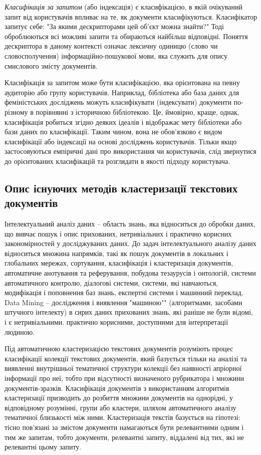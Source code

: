 \textit{Класифікація за запитом} (або індексація) є класифікацією, в якій очікуваний запит від користувачів впливає на те, як документи класифікуються. Класифікатор запитує себе: "За якими дескрипторами цей об'єкт можна знайти?" Тоді оброблюються всі можливі запити та обираються найбільш відповідні. Поняття дескриптора в даному контексті означає лексичну одиницю (слово чи словосполучення) інформаційно-пошукової мови, яка служить для опису смислового змісту документів.

Класифікація за запитом може бути класифікацією, яка орієнтована на певну аудиторію або групу користувачів. Наприклад, бібліотека або база даних для феміністських досліджень можуть класифікувати (індексувати) документи по-різному в порівнянні з історичною бібліотекою. Це, ймовірно, краще, однак, класифікація робиться згідно деяких ідеалів і відображає мету бібліотеки або бази даних по класифікації. Таким чином, вона не обов'язково є видом класифікації або індексації на основі досліджень користувачів. Тільки якщо застосовуються емпіричні дані про використання чи користувачів, слід звернутися до орієнтованих класифікацій та розглядати в якості підходу користувача.

\subsection{Опис існуючих методів кластеризації текстових документів}
Інтелектуальний аналіз даних – область знань, яка відноситься до обробки даних, що вивчає пошук і опис прихованих, нетривіальних і практично корисних закономірностей у досліджуваних даних. До задач інтелектуального аналізу даних відноситься множина напрямків, такі як пошук документів в локальних і глобальних мережах, сортування, класифікація і кластеризація документів, автоматичне анотування та реферування, побудова тезаурусів і онтологій, системи автоматичного контролю, діалогові системи, системи, які навчаються, модифікація і поповнення баз знань, експертні системи і машинний переклад. Data Mining – дослідження і виявлення "машиною"" (алгоритмами, засобами штучного інтелекту) в сирих даних прихованих знань, які раніше не були відомі, і є нетривіальними. практично корисними, доступними для інтерпретації людиною.

Під автоматичною кластеризацією текстових документів розуміють процес класифікації колекції текстових документів, який базується тільки на аналізі та виявленні внутрішньої тематичної структури колекції без наявності апріорної інформації про неї, тобто при відсутності визначеного рубрикатора і множини документів-зразків. Класифікація документів з використанням алгоритмів кластеризації призводить до розбиття множини документів на однорідні, у відповідному розумінні, групи або кластери, шляхом автоматичного аналізу тематичної близькості між ними. Кластеризація текстів базується на гіпотезі: тісно пов'язані за змістом документи намагаються бути релевантними одним і тим же запитам, тобто документи, релевантні запиту, віддалені від тих, які не релевантні цьому запиту.

